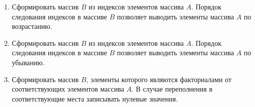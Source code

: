 \documentclass[a4paper, 12pt, oneside]{article}
\begin{document}
\begin{enumerate}
    \item Сформировать массив $B$ из индексов элементов массива $A$. Порядок следования индексов в массиве $B$ позволяет выводить элементы массива $A$ по возрастанию.
    \item Сформировать массив $B$ из индексов элементов массива $A$. Порядок следования индексов в массиве $B$ позволяет выводить элементы массива $A$ по убыванию.
    \item Сформировать массив $B$, элементы которого являются  факториалами от соответствующих элементов массива $A$. В случае переполнения в соответствующие места записывать нулевые значения.
\end{enumerate}
\end{document}
